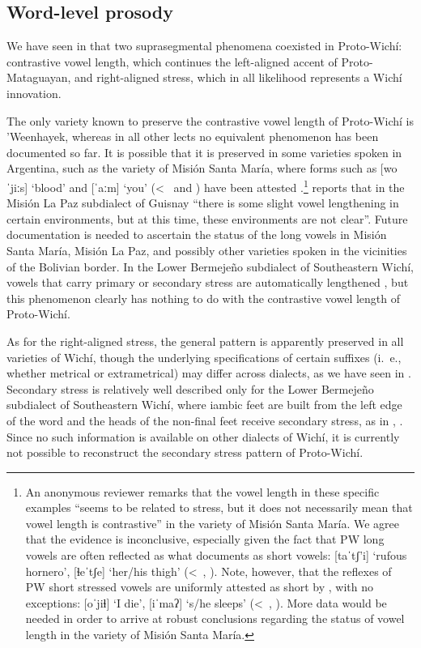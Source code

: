\subsection{Word-level prosody}
\fussy
We have seen in  that two suprasegmental phenomena coexisted in Proto-Wichí: contrastive vowel length, which continues the left-aligned accent of Proto-Mataguayan, and right-aligned stress, which in all likelihood represents a Wichí innovation.

The only variety known to preserve the contrastive vowel length of Proto-Wichí is ’Weenhayek, whereas in all other lects no equivalent phenomenon has been documented so far. It is possible that it is preserved in some varieties spoken in Argentina, such as the variety of Misión Santa María, where forms such as [woˈjiːs] `blood' and [ˈaːm] `you' (<~ and ) have been attested \citep{SS07}.\footnote{An anonymous reviewer remarks that the vowel length in these specific examples ``seems to be related to stress, but it does not necessarily mean that vowel length is contrastive'' in the variety of Misión Santa María. We agree that the evidence is inconclusive, especially given the fact that PW long vowels are often reflected as what \citet{SS07} documents as short vowels: [taˈtʃ’i] `rufous hornero', [ɬeˈtʃe] `her/his thigh' (<~, ). Note, however, that the reflexes of PW short stressed vowels are uniformly attested as short by \citet{SS07}, with no exceptions: [oˈjiɬ] `I die', [iˈmaʔ] `s/he sleeps' (<~, ). More data would be needed in order to arrive at robust conclusions regarding the status of vowel length in the variety of Misión Santa María.} \citet[63]{MA08} reports that in the Misión La Paz subdialect of Guisnay ``there is some slight vowel lengthening in certain environments, but at this time, these environments are not clear''. Future documentation is needed to ascertain the status of the long vowels in Misión Santa María, Misión La Paz, and possibly other varieties spoken in the vicinities of the Bolivian border. In the Lower Bermejeño subdialect of Southeastern Wichí, vowels that carry primary or secondary stress are automatically lengthened \citep[123]{VN14}, but this phenomenon clearly has nothing to do with the contrastive vowel length of Proto-Wichí.

As for the right-aligned stress, the general pattern is apparently preserved in all varieties of Wichí, though the underlying specifications of certain suffixes (i.~e., whether metrical or extrametrical) may differ across dialects, as we have seen in . Secondary stress is relatively well described only for the Lower Bermejeño subdialect of Southeastern Wichí, where iambic feet are built from the left edge of the word and the heads of the non-final feet receive secondary stress, as in ,  \citep[122]{VN14}. Since no such information is available on other dialects of Wichí, it is currently not possible to reconstruct the secondary stress pattern of Proto-Wichí.
